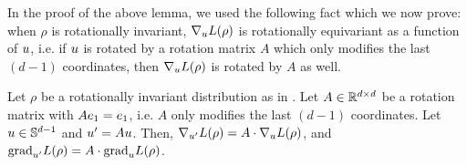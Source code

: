 In the proof of the above lemma, we used the following fact which we now prove: when $\rho$ is rotationally invariant, $\nabla_u L(\rho)$ is rotationally equivariant as a function of $u$, i.e. if $u$ is rotated by a rotation matrix $A$ which only modifies the last $(d - 1)$ coordinates, then $\nabla_u L(\rho)$ is rotated by $A$ as well.

\begin{lemma}  \label{lemma:grad_rot_equiv}
Let $\rho$ be a rotationally invariant distribution as in . Let $A \in \mathbb{R}^{d \times d}$ be a rotation matrix with $Ae_1 = e_1$, i.e. $A$ only modifies the last $(d - 1)$ coordinates. Let $u \in \mathbb{S}^{d - 1}$ and $u' = A u$. Then, $\nabla_{u'} L(\rho) = A \cdot \nabla_u L(\rho)$, and ${\textup{grad}}_{u'} L(\rho) = A \cdot {\textup{grad}}_u L(\rho)$.
\end{lemma}
